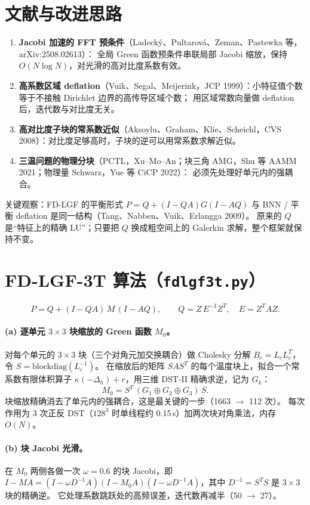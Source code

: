 \documentclass[11pt,a4paper]{ctexart}
\begin{document}
\section{文献与改进思路}
\begin{enumerate}
\item \textbf{Jacobi 加速的 FFT 预条件}（Ladecký、Pultarová、Zeman、Pastewka 等，arXiv:2508.02613）：
全局 Green 函数预条件串联局部 Jacobi 缩放，保持 $O(N\log N)$，对光滑的高对比度系数有效。
\item \textbf{高系数区域 deflation}（Vuik、Segal、Meijerink，JCP 1999）：小特征值个数等于不接触 Dirichlet 边界的高传导区域个数；
用区域常数向量做 deflation 后，迭代数与对比度无关。
\item \textbf{高对比度子块的常系数近似}（Aksoylu、Graham、Klie、Scheichl，CVS 2008）：对比度足够高时，子块的逆可以用常系数求解近似。
\item \textbf{三温问题的物理分块}（PCTL，Xu--Mo--An；块三角 AMG，Shu 等 AAMM 2021；物理量 Schwarz，Yue 等 CiCP 2022）：
必须先处理好单元内的强耦合。
\end{enumerate}
关键观察：FD-LGF 的平衡形式 $P=Q+(I-QA)G(I-AQ)$ 与 BNN / 平衡 deflation 是同一结构（Tang、Nabben、Vuik、Erlangga 2009）。
原来的 $Q$ 是“特征上的精确 LU”；只要把 $Q$ 换成粗空间上的 Galerkin 求解，整个框架就保持不变。

\section{FD-LGF-3T 算法（\texttt{fdlgf3t.py}）}
\[
P=Q+(I-QA)\,M\,(I-AQ),\qquad Q=Z\,E^{-1}Z^{T},\quad E=Z^{T}AZ .
\]
\paragraph{(a) 逐单元 $3\times3$ 块缩放的 Green 函数 $M_0$。}
对每个单元的 $3\times3$ 块（三个对角元加交换耦合）做 Cholesky 分解 $B_c=L_cL_c^{T}$，令 $S=\mathrm{blockdiag}(L_c^{-1})$。
在缩放后的矩阵 $SAS^{T}$ 的每个温度块上，拟合一个常系数有限体积算子 $\kappa(-\Delta_h)+r$，用三维 DST-II 精确求逆，记为 $G_k$：
\[
M_0=S^{T}\,(G_1\oplus G_2\oplus G_3)\,S .
\]
块缩放精确消去了单元内的强耦合，这是最关键的一步（1663 $\to$ 112 次）。
每次作用为 3 次正反 DST（$128^3$ 时单线程约 0.15\,s）加两次块对角乘法，内存 $O(N)$。

\paragraph{(b) 块 Jacobi 光滑。}在 $M_0$ 两侧各做一次 $\omega=0.6$ 的块 Jacobi，即
$I-MA=(I-\omega D^{-1}A)(I-M_0A)(I-\omega D^{-1}A)$，其中 $D^{-1}=S^{T}S$ 是 $3\times3$ 块的精确逆。
它处理系数跳跃处的高频误差，迭代数再减半（50 $\to$ 27）。
\end{document}
